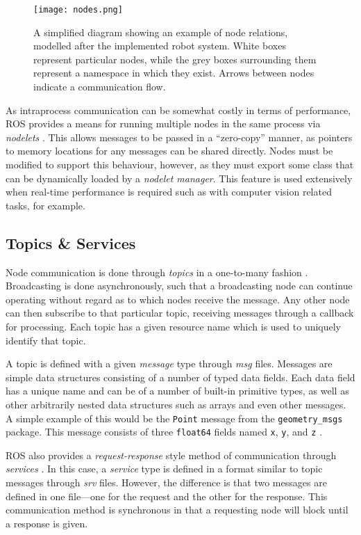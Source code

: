 \begin{figure}[!h]
    \centering
    \texttt{[image: nodes.png]}
    \caption{A simplified diagram showing an example of node relations, modelled after the implemented robot system. White boxes represent particular nodes, while the grey boxes surrounding them represent a namespace in which they exist. Arrows between nodes indicate a communication flow.}
    \label{fig:nodes}
\end{figure}

As intraprocess communication can be somewhat costly in terms of performance, ROS provides a means for running multiple nodes in the same process via \emph{nodelets} \cite{ros_wiki_nodelet}. This allows messages to be passed in a ``zero-copy'' manner, as pointers to memory locations for any messages can be shared directly. Nodes must be modified to support this behaviour, however, as they must export some class that can be dynamically loaded by a \emph{nodelet manager}. This feature is used extensively when real-time performance is required such as with computer vision related tasks, for example.

\subsection{Topics \& Services}
Node communication is done through \emph{topics} in a one-to-many fashion \cite{ros_paper}. Broadcasting is done asynchronously, such that a broadcasting node can continue operating without regard as to which nodes receive the message. Any other node can then subscribe to that particular topic, receiving messages through a callback for processing. Each topic has a given resource name which is used to uniquely identify that topic.

A topic is defined with a given \emph{message} type through \emph{msg} files. Messages are simple data structures consisting of a number of typed data fields. Each data field has a unique name and can be of a number of built-in primitive types, as well as other arbitrarily nested data structures such as arrays and even other messages. A simple example of this would be the \texttt{Point} message from the \texttt{geometry\_msgs} package. This message consists of three \texttt{float64} fields named \texttt{x}, \texttt{y}, and \texttt{z} \cite{ros_api_point_msg}.

ROS also provides a \emph{request-response} style method of communication through \emph{services} \cite{ros_wiki_services}. In this case, a \emph{service} type is defined in a format similar to topic messages through \emph{srv} files. However, the difference is that two messages are defined in one file---one for the request and the other for the response. This communication method is synchronous in that a requesting node will block until a response is given. 

